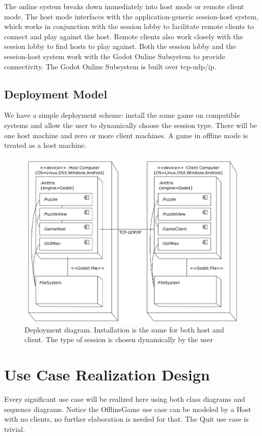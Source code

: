 \documentclass[12pt]{article}
\begin{document}
The online system breaks down immediately into host mode or remote client mode. The host
mode interfaces with the application-generic session-host system, which works in conjunction
with the session lobby to facilitate remote clients to connect and play against the host.
Remote clients also work closely with the session lobby to find hosts to play against. Both
the session lobby and the session-host system work with the Godot Online Subsystem to provide
connectivity. The Godot Online Subsystem is built over tcp-udp/ip.

\subsection{Deployment Model}
We have a simple deployment scheme: install the same game on compatible systems
and allow the user to dynamically choose the session type. There will be
one host machine and zero or more client machines. A game in offline mode is
treated as a host machine.
    \begin{figure}[H]
        \centering
        \includegraphics[width=6in]{deployment_diagram.png}
        \caption{Deployment diagram. Installation is the same for both host and
        client. The type of session is chosen dynamically by the user}
    \end{figure}

\section{Use Case Realization Design}
Every significant use case will be realized here using both class diagrams and
sequence diagrams. Notice the OfflineGame use case can be modeled by a Host
with no clients, no further elaboration is needed for that. The Quit use case
is trivial.
\end{document}

